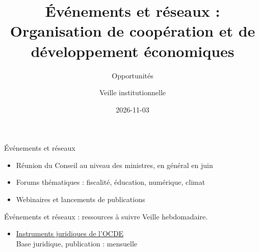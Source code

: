 \documentclass[aspectratio=169,11pt]{beamer}
\title{Événements et réseaux : Organisation de coopération et de développement économiques}
\subtitle{Opportunités}
\author{Veille institutionnelle}
\date{2026-11-03}
\begin{document}
\begin{frame}\titlepage\end{frame}

\begin{frame}{Événements et réseaux}
\begin{itemize}
\item Réunion du Conseil au niveau des ministres, en général en juin
\item Forums thématiques : fiscalité, éducation, numérique, climat
\item Webinaires et lancements de publications
\end{itemize}
\end{frame}

\begin{frame}{Événements et réseaux : ressources à suivre}
\small
Veille hebdomadaire.
\begin{itemize}
\item \href{https://legalinstruments.oecd.org}{Instruments juridiques de l'OCDE}\\{\footnotesize Base juridique, publication : mensuelle}
\end{itemize}
\end{frame}
\end{document}
